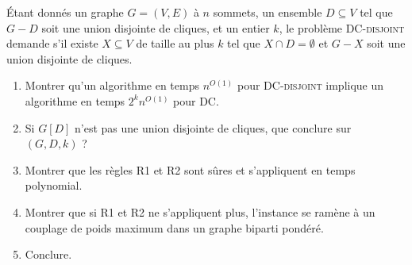 \begin{td-exo}
    \'Etant donn\'es un graphe \(G=(V,E)\) \`a \(n\) sommets, un ensemble \(D \subseteq V\) tel que \(G - D\) soit une union disjointe de cliques, et un entier \(k\), le probl\`eme \textsc{DC-disjoint} demande s'il existe \(X \subseteq V\) de taille au plus \(k\) tel que \(X \cap D = \emptyset\) et \(G - X\) soit une union disjointe de cliques.
    \begin{enumerate}
        \item Montrer qu'un algorithme en temps \(n^{O(1)}\) pour \textsc{DC-disjoint} implique un algorithme en temps \(2^k n^{O(1)}\) pour \textsc{DC}.
        \item Si \(G[D]\) n'est pas une union disjointe de cliques, que conclure sur \((G, D, k)\) ?
        \item Montrer que les r\`egles \textsc{R1} et \textsc{R2} sont s\^ures et s'appliquent en temps polynomial.
        \item Montrer que si \textsc{R1} et \textsc{R2} ne s'appliquent plus, l'instance se ram\`ene \`a un couplage de poids maximum dans un graphe biparti pond\'er\'e.
        \item Conclure.
    \end{enumerate}
\end{td-exo}

